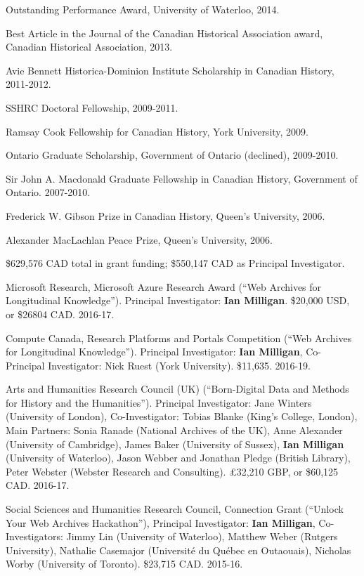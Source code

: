 \documentclass[11pt,article,oneside]{memoir}
\begin{document}
\ind Outstanding Performance Award, University of Waterloo, 2014.

\ind Best Article in the Journal of the Canadian Historical Association award, Canadian Historical Association, 2013.

\ind Avie Bennett Historica-Dominion Institute Scholarship in Canadian History, 2011-2012.

\ind SSHRC Doctoral Fellowship, 2009-2011.

\ind Ramsay Cook Fellowship for Canadian History, York University, 2009.

\ind Ontario Graduate Scholarship, Government of Ontario (declined), 2009-2010.

\ind Sir John A. Macdonald Graduate Fellowship in Canadian History, Government of Ontario. 2007-2010.

\ind Frederick W. Gibson Prize in Canadian History, Queen's University, 2006.

\ind Alexander MacLachlan Peace Prize, Queen's University, 2006.
\bigskip 

\medskip

\ind \$629,576 CAD total in grant funding; \$550,147 CAD as Principal Investigator.

\medskip

\ind Microsoft Research, Microsoft Azure Research Award (``Web Archives for Longitudinal Knowledge''). Principal Investigator: \textbf{Ian Milligan}. \$20,000 USD, or \$26804 CAD. 2016-17.

\ind Compute Canada, Research Platforms and Portals Competition (``Web Archives for Longitudinal Knowledge''). Principal Investigator: \textbf{Ian Milligan}, Co-Principal Investigator: Nick Ruest (York University). \$11,635. 2016-19.

\ind Arts and Humanities Research Council (UK) (``Born-Digital Data and Methods for History and the Humanities'').  Principal Investigator: Jane Winters (University of London), Co-Investigator: Tobias Blanke (King's College, London), Main Partners: Sonia Ranade (National Archives of the UK), Anne Alexander (University of Cambridge), James Baker (University of Sussex), \textbf{Ian Milligan} (University of Waterloo), Jason Webber and Jonathan Pledge (British Library), Peter Webster (Webster Research and Consulting). £32,210 GBP, or \$60,125 CAD. 2016-17.

\ind Social Sciences and Humanities Research Council, Connection Grant (``Unlock Your Web Archives Hackathon''), Principal Investigator: \textbf{Ian Milligan}, Co-Investigators: Jimmy Lin (University of Waterloo), Matthew Weber (Rutgers University), Nathalie Casemajor (Universit\'e du Qu\'ebec en Outaouais), Nicholas Worby (University of Toronto). \$23,715 CAD. 2015-16.
\end{document}
